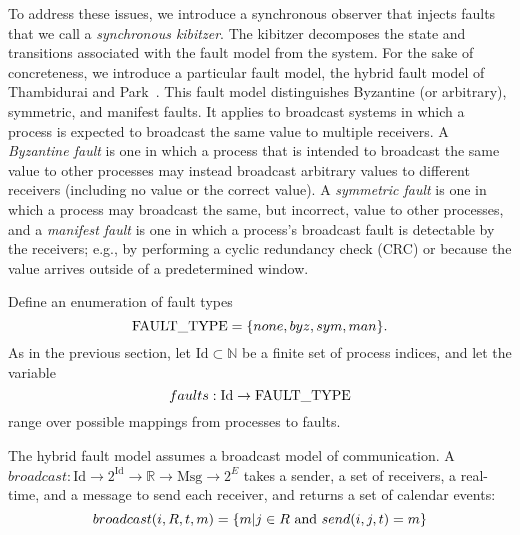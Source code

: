 \documentclass{llncs/llncs}
\newcommand{\Id}{\ensuremath{\mathrm{Id}}}
\newcommand{\Msg}{\ensuremath{\mathrm{Msg}}}
\newcommand{\lee}[1]{ } %
\newcommand{\lee}[1]{ {\color{blue}$<$lee: #1$>$} } %
\begin{document}
To address these issues, we introduce a synchronous observer that injects faults that we call a \emph{synchronous kibitzer}. The kibitzer decomposes the state and transitions associated with the fault model from the system. For the sake of concreteness, we introduce a particular fault model, the hybrid fault model of Thambidurai and Park~\cite{hybrid}. This fault model distinguishes Byzantine (or arbitrary), symmetric, and manifest faults. It  applies to broadcast systems in which a process is expected to broadcast the same value to multiple receivers. A \emph{Byzantine fault} is one in which a process that is intended to broadcast the same value to other processes may instead broadcast arbitrary values to different receivers (including no value or the correct value). A \emph{symmetric fault} is one in which a process may broadcast the same, but incorrect, value to other processes, and a \emph{manifest fault} is one in which a process's broadcast fault is detectable by the receivers; e.g., by performing a cyclic redundancy check (CRC) or because the value arrives outside of a predetermined window.


Define an enumeration of fault types $$\textnormal{FAULT\_TYPE} = \{none, byz, sym, man\}.$$ As in the previous section, let $\Id \subset \mathbb{N}$ be a finite set of process indices, and let the variable $$faults: \Id \rightarrow \textnormal{FAULT\_TYPE}$$ range over possible mappings from processes to faults.

The hybrid fault model assumes a broadcast model of communication.
A $broadcast: \Id \rightarrow 2^{\Id} \rightarrow \mathbb{R} \rightarrow \Msg \rightarrow 2^{E}$ takes a sender, a set of receivers, a real-time, and a message to send each receiver, and returns a set of calendar events:
$$broadcast(i, R, t, m) = \{m | j \in R \textnormal{ and } send(i, j, t) = m\}$$

\lee{msg in SAL is recv here}
\end{document}
